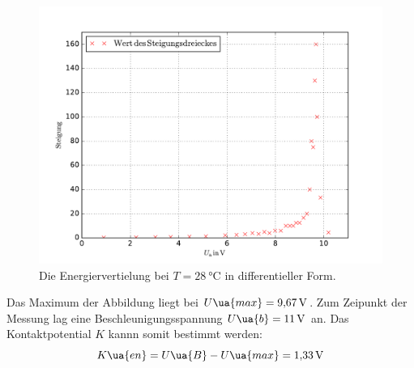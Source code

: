 \begin{figure}
  \centering
  \includegraphics[width=0.8 \textwidth]{../Messdaten/energie_zim.pdf}
  \caption{Die Energiervertielung bei $T=\SI{28}{\celsius}$ in differentieller Form.}
  \label{fig: energie_zim_diff}
\end{figure}
Das Maximum der Abbildung liegt bei $U\ua{max}=\SI{9.67}{\volt}$. Zum Zeipunkt der Messung
lag eine Beschleunigungsspannung $U\ua{b}=\SI{11}{\volt}$ an.
Das Kontaktpotential $K$ kannn somit bestimmt werden:
\begin{equation}
\label{eq:k_energie_zim}
  K\ua{en}=U\ua{B}-U\ua{max}=\SI{1.33}{\volt}
\end{equation}
\FloatBarrier
